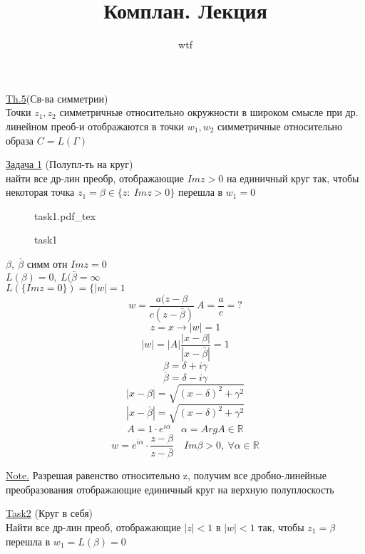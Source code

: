 \documentclass[a4paper]{article}
\newcommand{\incfig}[1]{%
\def\svgwidth{\columnwidth}
{#1.pdf_tex}
}
\begin{document}
\title{Комплан. Лекция}
\author{wtf}
\maketitle

\begin{tcolorbox}
\underline{Th.5}(Св-ва симметрии)\\
Точки $ z_1, z_2 $ симметричные относительно окружности в широком смысле при др.
линейном преоб-и отображаются в точки $ w_1, w_2 $ симметричные относительно 
образа $ C = L(\Gamma) $ 
\end{tcolorbox}

\begin{tcolorbox}
\underline{Задача 1} (Полупл-ть на круг)\\
найти все др-лин преобр, отображающие $ Im z > 0 $ на единичный круг так, чтобы
некоторая точка $ z_1 = \beta \in \{ z: \ Im z > 0 \} $ перешла в $ w_1 = 0 $  
\end{tcolorbox}

\begin{figure}[!ht]
    \centering
    \incfig{task1}
    \caption{task1}
\end{figure}

$ \beta,\  \bar{\beta} $ симм отн $ Im z = 0 $ \\
$ L(\beta) = 0, \  L(\bar{\beta} = \infty $ \\
$ L(\{ Im z = 0 \} ) = \{ |w| = 1 $ 
\[
    w= \frac{a(z-\beta}{c(z-\bar{\beta})}  \ A = \frac{a}{c} = ?
\]
\[
    z = x \to |w|=1
\]
\[
    |w|  = |A| \frac{|x-\beta|}{|x - \bar{\beta}|}  = 1
\]
\[
    \beta = \delta + i\gamma
\]
\[
    \bar{\beta} = \delta - i\gamma
\]
\[
    |x-\beta| = \sqrt{(x - \delta)^2 + \gamma^2} 
\]
\[
    |x-\bar{\beta}| = \sqrt{(x - \delta)^2 + \gamma^2} 
\]
\[
    A = 1 \cdot e^{i\alpha} \quad \alpha = Arg A \in \mathbb{R}
\]
\[
    w = e^{i\alpha} \cdot \frac{z -\beta}{z - \bar{\beta}} \quad Im \beta > 0 
    , \ \forall \alpha \in \mathbb{R}
\]

\underline{Note.} Разрешая равенство относительно z, получим все дробно-линейные
преобразования отображающие единичный круг на верхную полуплоскость

\begin{tcolorbox}
\underline{Task2} (Круг в себя)\\
Найти все др-лин преоб, отображающие $ |z| < 1 $ в $ |w| < 1 $ так, чтобы
$ z_1 = \beta $ перешла в $ w_1 = L(\beta) = 0 $ 
\end{tcolorbox}
\end{document}
